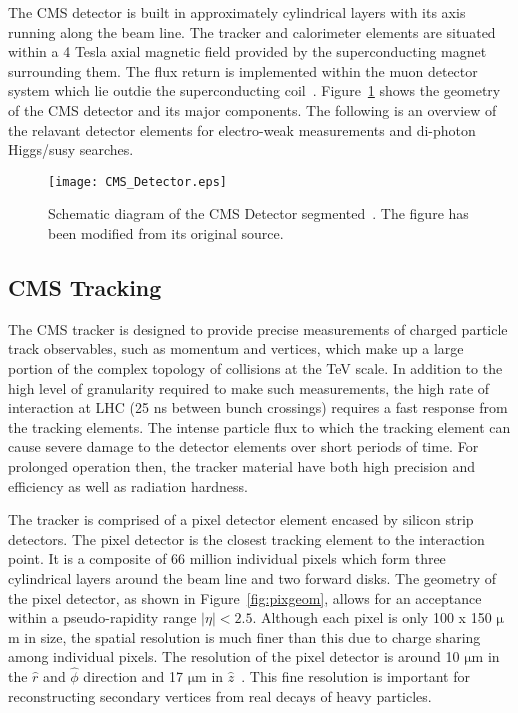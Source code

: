 \documentclass[a4paper,10pt]{article}
\begin{document}
The CMS detector is built in approximately cylindrical layers with its axis running along the beam line. The tracker and calorimeter elements are situated within a 4 Tesla axial magnetic field provided by 
the superconducting magnet surrounding them. The flux return is implemented within the muon detector system which lie outdie the superconducting coil~\cite{cmsdetector}. 
Figure~\ref{fig:cms} shows the geometry of the CMS detector and its major components. The following is an overview of the relavant detector elements for electro-weak measurements and di-photon Higgs/susy
searches.

 \begin{figure}[!ht]
 			\centering
 			\texttt{[image: CMS\_Detector.eps]}
 			\caption{Schematic diagram of the CMS Detector segmented~\cite{cmspub}. The figure has been modified from its original source.}
   \label{fig:cms}
\end{figure}

\subsection{CMS Tracking}

The CMS tracker is designed to provide precise measurements of charged particle track observables, such as momentum and vertices, which make up a large portion of the complex topology of collisions at the 
TeV scale. In addition to the high level of granularity required to make such measurements, the high rate of interaction at LHC (25 ns between bunch crossings) requires a fast response from the tracking 
elements. The intense particle flux to which the tracking element can cause severe damage to the detector elements over short periods of time. For prolonged operation then, the tracker material have both
high precision and efficiency as well as radiation hardness.

The tracker is comprised of a pixel detector element encased by silicon strip detectors. The pixel detector is the closest tracking element to the interaction 
point. It is a composite of 66 million individual pixels which form three cylindrical layers around the beam line and two forward disks. The geometry of the pixel detector, 
as shown in Figure~\ref{fig:pixgeom}, allows for an acceptance within a pseudo-rapidity range $ |\eta| < 2.5$.
Although each pixel is only 100 x 150 $\mathrm{\mu}$m in size, the spatial resolution is much finer than this due to charge sharing among individual pixels. 
The resolution of the pixel detector is around 10 $\mathrm{\mu}$m in the $\hat{r}$ and $\hat{\phi}$ direction and 17 $\mathrm{\mu}$m in $\hat{z}$~\cite{trckAC}. 
This fine resolution is important for reconstructing secondary vertices from real decays of heavy particles.  
\end{document}
